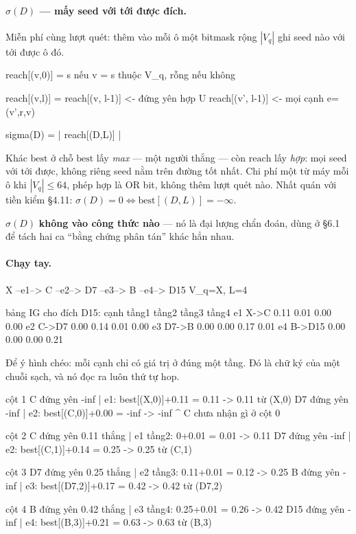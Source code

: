 \documentclass[11pt,a4paper]{article}
\newcommand{\best}{\mathrm{best}}
\begin{document}
\paragraph{$\sigma(D)$ --- mấy seed với tới được đích.} Miễn phí cùng lượt quét: thêm vào
mỗi ô một bitmask rộng $|V_q|$ ghi seed nào với tới được ô đó.

\begin{dia}
reach[(v,0)]  =  {s}   nếu v = s thuộc V_q,    rỗng  nếu không

reach[(v,l)]  =  reach[(v, l-1)]                 <- đứng yên
                 hợp  U reach[(v', l-1)]         <- mọi cạnh e=(v',r,v)

sigma(D)  =  | reach[(D,L)] |
\end{dia}

Khác $\best$ ở chỗ $\best$ lấy \emph{max} --- một người thắng --- còn $\mathrm{reach}$ lấy
\emph{hợp}: mọi seed với tới được, không riêng seed nằm trên đường tốt nhất. Chi phí một từ
máy mỗi ô khi $|V_q|\le 64$, phép hợp là OR bit, không thêm lượt quét nào. Nhất quán với
tiền kiểm \S4.11: $\sigma(D)=0 \iff \best[(D,L)]=-\infty$.

$\sigma(D)$ \textbf{không vào công thức nào} --- nó là đại lượng chẩn đoán, dùng ở \S6.1 để
tách hai ca ``bằng chứng phân tán'' khác hẳn nhau.

\paragraph{Chạy tay.}

\begin{dia}
X --e1--> C --e2--> D7 --e3--> B --e4--> D15       V_q={X}, L=4

bảng IG cho đích D15:
cạnh          tầng1   tầng2   tầng3   tầng4
e1  X->C       0.11    0.01    0.00    0.00
e2  C->D7      0.00    0.14    0.01    0.00
e3  D7->B      0.00    0.00    0.17    0.01
e4  B->D15     0.00    0.00    0.00    0.21
\end{dia}

Để ý hình chéo: mỗi cạnh chỉ có giá trị ở đúng một tầng. Đó là chữ ký của một chuỗi sạch, và nó đọc ra luôn thứ tự hop.

\begin{dia}
cột 1   C    đứng yên -inf | e1: best[(X,0)]+0.11 = 0.11     -> 0.11 từ (X,0)
        D7   đứng yên -inf | e2: best[(C,0)]+0.00 = -inf      -> -inf
                                      ^ C chưa nhận gì ở cột 0

cột 2   C    đứng yên 0.11 thắng | e1 tầng2: 0+0.01 = 0.01    -> 0.11
        D7   đứng yên -inf | e2: best[(C,1)]+0.14 = 0.25      -> 0.25 từ (C,1)

cột 3   D7   đứng yên 0.25 thắng | e2 tầng3: 0.11+0.01 = 0.12 -> 0.25
        B    đứng yên -inf | e3: best[(D7,2)]+0.17 = 0.42     -> 0.42 từ (D7,2)

cột 4   B    đứng yên 0.42 thắng | e3 tầng4: 0.25+0.01 = 0.26 -> 0.42
        D15  đứng yên -inf | e4: best[(B,3)]+0.21 = 0.63      -> 0.63 từ (B,3)
\end{dia}
\end{document}
